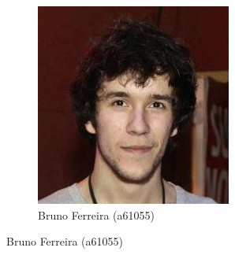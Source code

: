 \documentclass[11pt, a4paper, twoside]{article}
\begin{document}
\begin{figure}[h!]
\centering
\begin{subfigure}{.5\textwidth}
  \centering
  \includegraphics[width=0.6\linewidth]{brunoferreira}
  \caption{Bruno Ferreira (a61055)}
\end{subfigure}%
\end{figure}
\end{document}
